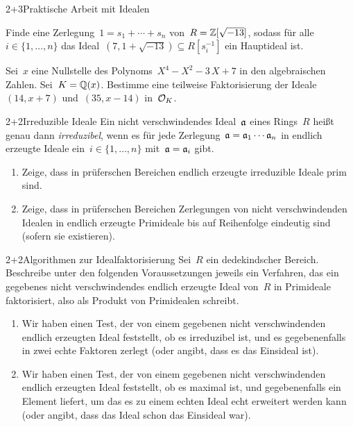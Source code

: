 \documentclass{algblatt}
\begin{document}

\begin{aufgabeE}{2+3}{Praktische Arbeit mit Idealen}
\item Finde eine Zerlegung~$1 = s_1 + \cdots + s_n$ von~$R = \ZZ[\sqrt{-13}]$,
sodass für alle~$i \in \{ 1,\ldots,n \}$ das Ideal~$(7, 1 + \sqrt{-13})
\subseteq R[s_i^{-1}]$ ein Hauptideal ist.
\item Sei~$x$ eine Nullstelle des Polynoms~$X^4-X^2-3\,X+7$ in den
algebraischen Zahlen. Sei~$K = \QQ(x)$. Bestimme eine teilweise Faktorisierung
der Ideale~$(14,x+7)$ und~$(35,x-14)$ in~$\O_K$.
\end{aufgabeE}

\begin{aufgabe}{2+2}{Irreduzible Ideale}
Ein nicht verschwindendes Ideal~$\aa$ eines Rings~$R$ heißt genau dann
\emph{irreduzibel}, wenn es für jede Zerlegung~$\aa = \aa_1 \cdots \aa_n$ in
endlich erzeugte Ideale ein~$i \in \{1,\ldots,n\}$ mit~$\aa = \aa_i$ gibt.
\begin{enumerate}
\item Zeige, dass in prüferschen Bereichen endlich erzeugte irreduzible Ideale prim sind.
\item Zeige, dass in prüferschen Bereichen Zerlegungen von nicht
verschwindenden Idealen in endlich erzeugte Primideale
bis auf Reihenfolge eindeutig sind (sofern sie existieren).
\end{enumerate}
\end{aufgabe}

\begin{aufgabe}{2+2}{Algorithmen zur Idealfaktorisierung}
Sei~$R$ ein dedekindscher Bereich. Beschreibe unter den folgenden
Voraussetzungen jeweils ein Verfahren, das ein gegebenes nicht verschwindendes
endlich erzeugte Ideal von~$R$ in Primideale faktorisiert, also als Produkt von
Primidealen schreibt.
\begin{enumerate}
\item Wir haben einen Test, der von einem gegebenen nicht verschwindenden endlich erzeugten Ideal feststellt,
ob es irreduzibel ist, und es gegebenenfalls in zwei echte Faktoren zerlegt
(oder angibt, dass es das Einsideal ist).
\item Wir haben einen Test, der von einem gegebenen nicht verschwindenden endlich erzeugten Ideal
feststellt, ob es maximal ist, und gegebenenfalls ein Element liefert, um das
es zu einem echten Ideal echt erweitert werden kann (oder angibt, dass das
Ideal schon das Einsideal war).
\end{enumerate}
\end{aufgabe}
\end{document}
